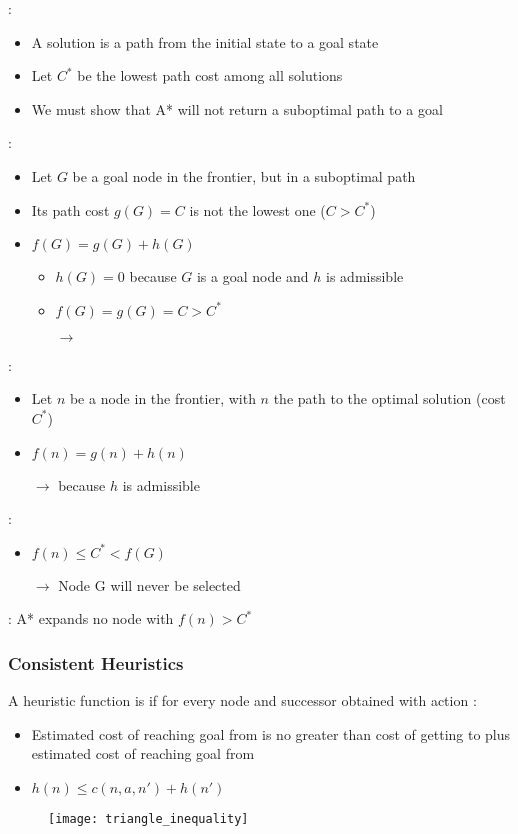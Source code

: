  :
\begin{itemize}
\item A solution is a path from the initial state to a goal state
\item Let $C^*$ be the lowest path cost among all solutions
\item We must show that A* will not return a suboptimal path to a goal
\end{itemize}
 :
\begin{itemize}
\item Let $G$ be a goal node in the frontier, but in a suboptimal path
\item Its path cost $g(G)=C$ is not the lowest one ($C>C^*$)
\item $f(G) = g(G) + h(G)$
	\begin{itemize}
	\item $h(G) = 0$ because $G$ is a goal node and $h$ is admissible
	\item $f(G) = g(G) = C > C^*$
	\item[$\rightarrow$] 
	\end{itemize}
\end{itemize}
 :
\begin{itemize}
\item Let $n$ be a node in the frontier, with $n$ the path to the optimal solution (cost $C^*$)
\item $f(n) = g(n) + h(n)$
\item[$\rightarrow$]  because $h$ is admissible
\end{itemize}
 :
\begin{itemize}
\item $f(n) \leq C^* < f(G)$
\item[$\rightarrow$] Node G will never be selected
\end{itemize}
 : A* expands no node with $f(n) > C^*$

\subsubsection{Consistent Heuristics}

A heuristic function is  if for every node  and successor  obtained with action  :


\begin{minipage}{0.59\textwidth}
	\begin{itemize}
	\item Estimated cost of reaching goal from  is no greater than cost of getting to  plus estimated cost of reaching goal from 
	\item $h(n) \leq c(n, a, n') + h(n')$
	\end{itemize}
\end{minipage}
\begin{minipage}{0.4\textwidth}
	\begin{figure}[H]
		\centering
		\texttt{[image: triangle\_inequality]}
	\end{figure}
\end{minipage}

